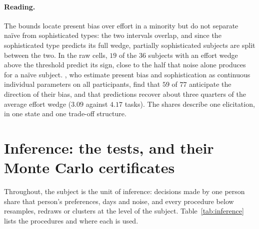 \documentclass[11pt,a4paper]{article}
\theoremstyle{plain}
\theoremstyle{definition}
\begin{document}
\paragraph{Reading.} The bounds locate present bias over effort in a minority but do not separate na\"ive from
sophisticated types: the two intervals overlap, and since the sophisticated type predicts its full wedge, partially
sophisticated subjects are split between the two. In the raw cells, $19$ of the $36$ subjects with an effort wedge
above the threshold predict its sign, close to the half that noise alone produces for a na\"ive subject.
\citet{cerrone2026}, who estimate present bias and sophistication as continuous individual parameters on all
participants, find that $59$ of $77$ anticipate the direction of their bias, and that predictions recover about three
quarters of the average effort wedge ($3.09$ against $4.17$ tasks). The shares describe one elicitation, in one state
and one trade-off structure.

\section{Inference: the tests, and their Monte Carlo certificates}
\label{app:inference}

Throughout, the subject is the unit of inference: decisions made by one person share that person's preferences, days
and noise, and every procedure below resamples, redraws or clusters at the level of the subject.
Table~\ref{tab:inference} lists the procedures and where each is used.
\end{document}
